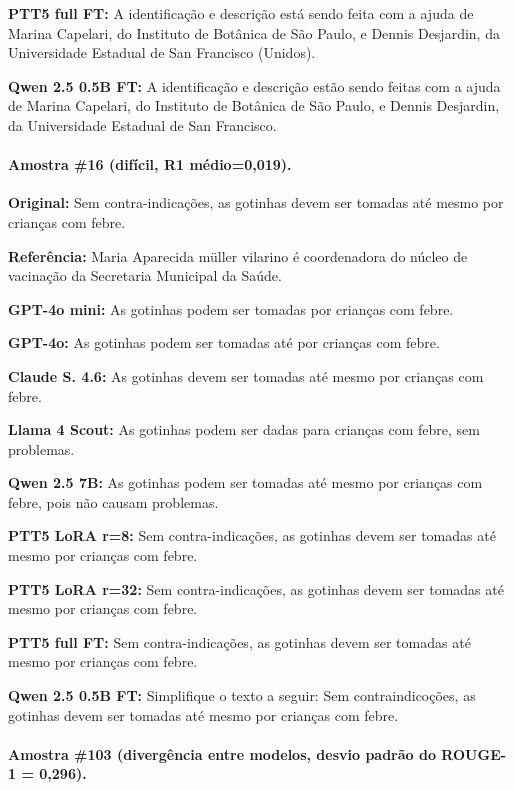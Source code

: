 \documentclass[a4paper, twocolumn, 11pt, twoside]{article}
\begin{document}
\textbf{PTT5 full FT:} A identificação e descrição está sendo feita com a ajuda de Marina Capelari, do Instituto de Botânica de São Paulo, e Dennis Desjardin, da Universidade Estadual de San Francisco (Unidos).

\textbf{Qwen 2.5 0.5B FT:} A identificação e descrição estão sendo feitas com a ajuda de Marina Capelari, do Instituto de Botânica de São Paulo, e Dennis Desjardin, da Universidade Estadual de San Francisco.

\bigskip
\paragraph*{Amostra \#16 (difícil, R1 médio=0,019).}

\textbf{Original:} Sem contra-indicações, as gotinhas devem ser tomadas até mesmo por crianças com febre.

\textbf{Referência:} Maria Aparecida müller vilarino é coordenadora do núcleo de vacinação da Secretaria Municipal da Saúde.

\textbf{GPT-4o mini:} As gotinhas podem ser tomadas por crianças com febre.

\textbf{GPT-4o:} As gotinhas podem ser tomadas até por crianças com febre.

\textbf{Claude S. 4.6:} As gotinhas devem ser tomadas até mesmo por crianças com febre.

\textbf{Llama 4 Scout:} As gotinhas podem ser dadas para crianças com febre, sem problemas.

\textbf{Qwen 2.5 7B:} As gotinhas podem ser tomadas até mesmo por crianças com febre, pois não causam problemas.

\textbf{PTT5 LoRA r=8:} Sem contra-indicações, as gotinhas devem ser tomadas até mesmo por crianças com febre.

\textbf{PTT5 LoRA r=32:} Sem contra-indicações, as gotinhas devem ser tomadas até mesmo por crianças com febre.

\textbf{PTT5 full FT:} Sem contra-indicações, as gotinhas devem ser tomadas até mesmo por crianças com febre.

\textbf{Qwen 2.5 0.5B FT:} Simplifique o texto a seguir: Sem contraindicoções, as gotinhas devem ser tomadas até mesmo por crianças com febre.

\bigskip
\paragraph*{Amostra \#103 (divergência entre modelos, desvio padrão do ROUGE-1 = 0,296).}
\end{document}
